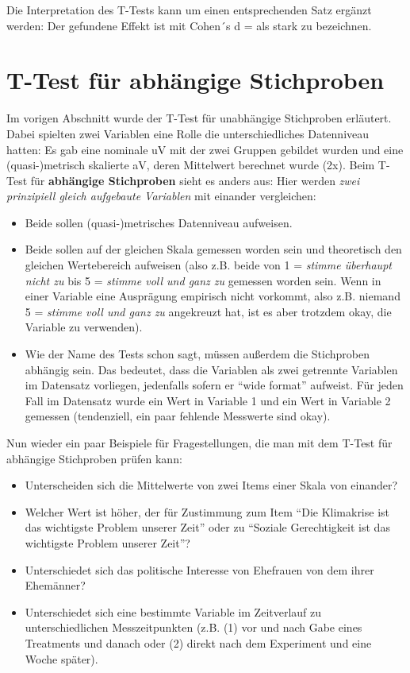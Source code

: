 \documentclass[
]{book}
\begin{document}
Die Interpretation des T-Tests kann um einen entsprechenden Satz ergänzt werden: Der gefundene Effekt ist mit Cohen´s d =  als stark zu bezeichnen.

\hypertarget{t-test-fuxfcr-abhuxe4ngige-stichproben}{%
\section{T-Test für abhängige Stichproben}\label{t-test-fuxfcr-abhuxe4ngige-stichproben}}

Im vorigen Abschnitt wurde der T-Test für unabhängige Stichproben erläutert. Dabei spielten zwei Variablen eine Rolle die unterschiedliches Datenniveau hatten: Es gab eine nominale uV mit der zwei Gruppen gebildet wurden und eine (quasi-)metrisch skalierte aV, deren Mittelwert berechnet wurde (2x). Beim T-Test für \textbf{abhängige Stichproben} sieht es anders aus: Hier werden \emph{zwei prinzipiell gleich aufgebaute Variablen} mit einander vergleichen:

\begin{itemize}
\item
  Beide sollen (quasi-)metrisches Datenniveau aufweisen.
\item
  Beide sollen auf der gleichen Skala gemessen worden sein und theoretisch den gleichen Wertebereich aufweisen (also z.B. beide von 1 = \emph{stimme überhaupt nicht zu} bis 5 = \emph{stimme voll und ganz zu} gemessen worden sein. Wenn in einer Variable eine Ausprägung empirisch nicht vorkommt, also z.B. niemand 5 = \emph{stimme voll und ganz zu} angekreuzt hat, ist es aber trotzdem okay, die Variable zu verwenden).
\item
  Wie der Name des Tests schon sagt, müssen außerdem die Stichproben abhängig sein. Das bedeutet, dass die Variablen als zwei getrennte Variablen im Datensatz vorliegen, jedenfalls sofern er ``wide format'' aufweist. Für jeden Fall im Datensatz wurde ein Wert in Variable 1 und ein Wert in Variable 2 gemessen (tendenziell, ein paar fehlende Messwerte sind okay).
\end{itemize}

Nun wieder ein paar Beispiele für Fragestellungen, die man mit dem T-Test für abhängige Stichproben prüfen kann:

\begin{itemize}
\item
  Unterscheiden sich die Mittelwerte von zwei Items einer Skala von einander?
\item
  Welcher Wert ist höher, der für Zustimmung zum Item ``Die Klimakrise ist das wichtigste Problem unserer Zeit'' oder zu ``Soziale Gerechtigkeit ist das wichtigste Problem unserer Zeit''?
\item
  Unterschiedet sich das politische Interesse von Ehefrauen von dem ihrer Ehemänner?
\item
  Unterschiedet sich eine bestimmte Variable im Zeitverlauf zu unterschiedlichen Messzeitpunkten (z.B. (1) vor und nach Gabe eines Treatments und danach oder (2) direkt nach dem Experiment und eine Woche später).
\end{itemize}
\end{document}

